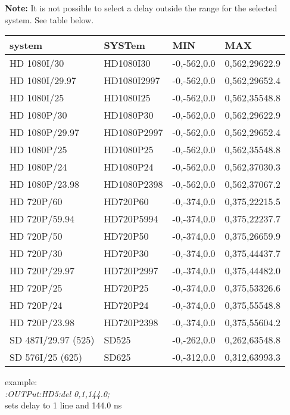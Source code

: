 \textbf{Note:} It is not possible to select a delay outside the range for the selected system.  See table below.

\begin{tabular}{|l|l|l|l|}
\hline
system         &     SYSTem     &     MIN      &       MAX\\ \hline
\hline
HD 1080I/30        &  HD1080I30    & -0,-562,0.0 & 0,562,29622.9\\ \hline
HD 1080I/29.97     &  HD1080I2997  & -0,-562,0.0 & 0,562,29652.4\\ \hline
HD 1080I/25        &  HD1080I25    & -0,-562,0.0 & 0,562,35548.8\\ \hline
HD 1080P/30        &  HD1080P30    & -0,-562,0.0 & 0,562,29622.9\\ \hline
HD 1080P/29.97     &  HD1080P2997  & -0,-562,0.0 & 0,562,29652.4\\ \hline
HD 1080P/25        &  HD1080P25    & -0,-562,0.0 & 0,562,35548.8\\ \hline
HD 1080P/24        &  HD1080P24    & -0,-562,0.0 & 0,562,37030.3\\ \hline
HD 1080P/23.98     &  HD1080P2398  & -0,-562,0.0 & 0,562,37067.2\\ \hline
HD 720P/60         &  HD720P60     & -0,-374,0.0 & 0,375,22215.5\\ \hline
HD 720P/59.94      &  HD720P5994   & -0,-374,0.0 & 0,375,22237.7\\ \hline
HD 720P/50         &  HD720P50     & -0,-374,0.0 & 0,375,26659.9\\ \hline
HD 720P/30         &  HD720P30     & -0,-374,0.0 & 0,375,44437.7\\ \hline
HD 720P/29.97      &  HD720P2997   & -0,-374,0.0 & 0,375,44482.0\\ \hline
HD 720P/25         &  HD720P25     & -0,-374,0.0 & 0,375,53326.6\\ \hline
HD 720P/24         &  HD720P24     & -0,-374,0.0 & 0,375,55548.8\\ \hline
HD 720P/23.98      &  HD720P2398   & -0,-374,0.0 & 0,375,55604.2\\ \hline
SD 487I/29.97 (525)&  SD525        & -0,-262,0.0 & 0,262,63548.8\\ \hline
SD 576I/25 (625)   &  SD625        & -0,-312,0.0 & 0,312,63993.3\\ \hline
\end{tabular}

example:\\
\textit{:OUTPut:HD5:del 0,1,144.0;}\\
sets delay to 1 line and 144.0 ns

